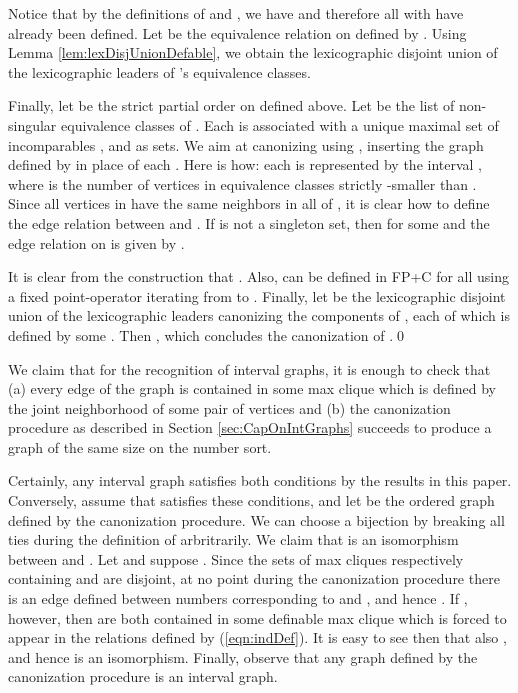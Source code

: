 \documentclass[10pt]{article}
\theoremstyle{remark}
\theoremstyle{definition}
\theoremstyle{plain}
\newcommand{\logic}[1]{\textsf{\upshape\relsize{-0.5}#1}\xspace}
\newcommand{\FPC}{\logic{FP+C}}
\begin{document}
Notice that by the definitions of  and , we have  and therefore all  with  have already been defined. Let  be the equivalence relation on  defined by . Using Lemma \ref{lem:lexDisjUnionDefable}, we obtain the lexicographic disjoint union  of the lexicographic leaders of 's equivalence classes.


Finally, let  be the strict partial order on  defined above. Let  be the list of non-singular equivalence classes of . Each  is associated with a unique maximal set of incomparables , and  as sets. We aim at canonizing  using , inserting the graph defined by  in place of each . Here is how: each  is represented by the interval , where  is the number of vertices in equivalence classes strictly -smaller than . Since all vertices in  have the same neighbors in all of , it is clear how to define the edge relation between  and . If  is not a singleton set, then  for some  and the edge relation on  is given by .




It is clear from the construction that . Also,  can be defined in \FPC for all  using a fixed point-operator iterating  from  to . Finally, let  be the lexicographic disjoint union of the lexicographic leaders canonizing the components of , each of which is defined by some . Then , which concludes the canonization of .\qed




We claim that for the recognition of interval graphs, it is enough to check that (a) every edge of the graph  is contained in some max clique which is defined by the joint neighborhood of some pair of vertices and (b) the canonization procedure as described in Section \ref{sec:CapOnIntGraphs} succeeds to produce a graph of the same size on the number sort. 

Certainly, any interval graph satisfies both conditions by the results in this paper. Conversely, assume that  satisfies these conditions, and let  be the ordered graph defined by the canonization procedure. We can choose a bijection  by breaking all ties during the definition of  arbritrarily. We claim that  is an isomorphism between  and . Let  and suppose . Since the sets of max cliques respectively containing  and  are disjoint, at no point during the canonization procedure there is an edge defined between numbers corresponding to  and , and hence . If , however, then  are both contained in some definable max clique  which is forced to appear in the relations  defined by (\ref{eqn:indDef}). It is easy to see then that also , and hence  is an isomorphism. Finally, observe that any graph defined by the canonization procedure is an interval graph.
\end{document}

